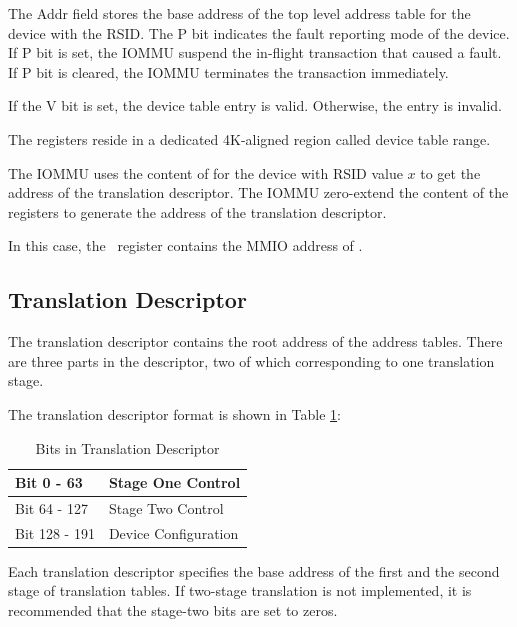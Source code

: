 The Addr field stores the base address of the top level address table for the device with
the RSID. The P bit indicates the fault reporting mode of the device. If P bit is set, the
IOMMU suspend the in-flight transaction that caused a fault. If P bit is cleared, the
IOMMU terminates the transaction immediately. 

If the V bit is set, the device table entry is valid. Otherwise, the entry is invalid.

The \dte[$x$] registers reside in a dedicated 4K-aligned region called device table range.

The IOMMU uses the content of \dte[$x$] for the device with RSID value $x$ to get the
address of the translation descriptor. The IOMMU zero-extend the content of the \dte[$x$]
registers to generate the address of the translation descriptor.

In this case, the \dtbase\ register contains the MMIO address of \dte[$0$].

\subsection{Translation Descriptor}
\label{sec:trans_desc}

The translation descriptor contains the root address of the address tables. There are
three parts in the descriptor, two of which corresponding to one translation stage.

The translation descriptor format is shown in Table \ref{tbl:dev-tbl-bits}:

\begin{table}[h!t]
    \centering
    \begin{tabular}{ | l | l | }

    \hline
    Bit 0 - 63   & Stage One Control \\
    \hline
    Bit 64 - 127 & Stage Two Control \\
    \hline
    Bit 128 - 191 & Device Configuration \\
    \hline

    \end{tabular}
    \caption{Bits in Translation Descriptor}
    \label{tbl:dev-tbl-bits}
\end{table}


Each translation descriptor specifies the base address of the first and the second stage
of translation tables. If two-stage translation is not implemented, it is recommended that
the stage-two bits are set to zeros. 

